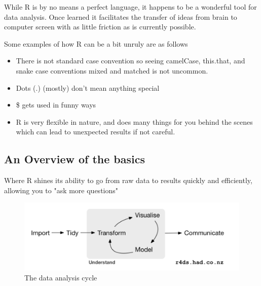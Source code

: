 \documentclass{article}
\begin{document}
While R is by no means a perfect language, it happens to be a wonderful tool for data analysis. Once learned it facilitates the transfer of ideas from brain to computer screen with as little friction as is currently possible.

\begin{flushleft}
Some examples of how R can be a bit unruly are as follows
\end{flushleft}

\begin{itemize}
    \item There is not standard case convention so seeing camelCase, this.that, and snake case conventions mixed and matched is not uncommon.
    \item Dots (.) (mostly) don’t mean anything special
    \item \$ gets used in funny ways
    \item R is very flexible in nature, and does many things for you behind the scenes which can lead to unexpected results if not careful. 
\end{itemize}

\subsection{An Overview of the basics}

\begin{flushleft}
Where R shines its ability to go from raw data to results quickly and efficiently, allowing you to "ask more questions"
\end{flushleft}

\begin{figure}[H]
    \centering
    \includegraphics[width=.6\textwidth]{data_analysis_cycle.png}
    \caption{The data analysis cycle}
    \label{fig:data_analysis_cycle}
\end{figure}
\end{document}
